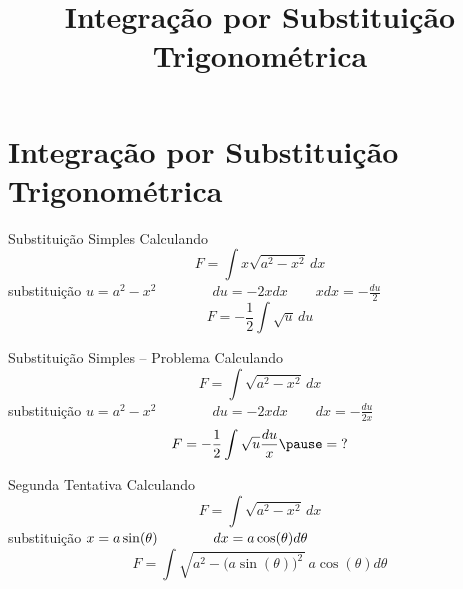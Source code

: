 
\usepackage{integracao_e_series}
\usepackage{ulem}

\title{Integração por Substituição Trigonométrica}



\addtitle

\section{Integração por Substituição Trigonométrica}

\begin{frame}{Substituição Simples}
  Calculando
  \[
    F = \int x \sqrt{a^2-x^2}\,dx
  \]
  \pause
  substituição
  \(
    u = a^2-x^2
    \qquad\qquad
    du = -2xdx
    \qquad
    xdx = -\frac{du}{2}
  \)
  \pause
  \[
    F = -\frac{1}{2}\int \sqrt{u}\,du
  \]
\end{frame}

\begin{frame}{Substituição Simples -- Problema}
  Calculando
  \[
    F = \int \sqrt{a^2-x^2}\,dx
  \]
  \pause
  substituição
  \(
    u = a^2-x^2
    \qquad\qquad
    du = -2xdx
    \qquad
    dx = -\frac{du}{2x}
  \)
  \pause
  \[
    F
    = -\frac{1}{2}\int \sqrt{u} \frac{du}{x}
    \pause
    =\; ? \vphantom{\int}
  \]
\end{frame}

\begin{frame}{Segunda Tentativa}
  Calculando
  \[
    F = \int \sqrt{a^2-x^2}\,dx
  \]
  \pause
  substituição
  \(
    x = a\sin(\theta)
    \qquad\qquad
    dx = a\cos(\theta)d\theta
    \vphantom{\frac{du}{2}}
  \)
  \pause
  \[
    F = \int \sqrt{a^2 - \big(a\sin(\theta)\big)^2\,} \,a\cos(\theta)d\theta
  \]
\end{frame}

